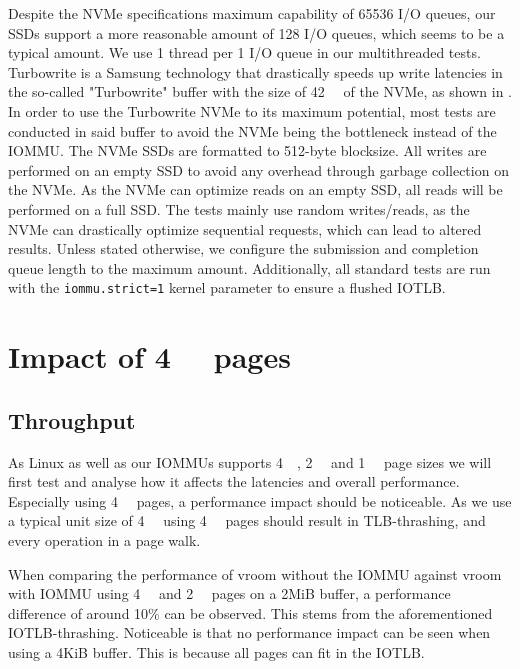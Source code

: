 Despite the NVMe specifications maximum capability of 65536 I/O queues, our SSDs support a more reasonable amount of 128 I/O queues, which seems to be a typical amount.
We use 1 thread per 1 I/O queue in our multithreaded tests. Turbowrite is a Samsung technology that drastically speeds up write latencies in the so-called "Turbowrite" buffer with the size of \qty{42}{\giga\byte} of the NVMe, as shown in \cite{vroom}. In order to use the Turbowrite NVMe to its maximum potential, most tests are conducted in said buffer to avoid the NVMe being the bottleneck instead of the IOMMU.
The NVMe SSDs are formatted to 512-byte blocksize. All writes are performed on an empty SSD to avoid any overhead through garbage collection on the NVMe. As the NVMe can optimize reads on an empty SSD, all reads will be performed on a full SSD. The tests mainly use random writes/reads, as the NVMe can drastically optimize sequential requests, which can lead to altered results.
Unless stated otherwise, we configure the submission and completion queue length to the maximum amount.
Additionally, all standard tests are run with the \texttt{iommu.strict=1} kernel parameter to ensure a flushed IOTLB.

\section{Impact of \qty{4}{\kibi\byte} pages}
\subsection{Throughput}
As Linux as well as our IOMMUs supports \qty{4}{\kibi\byte}, \qty{2}{\mebi\byte} and \qty{1}{\gibi\byte} page sizes we will first test and analyse how it affects the latencies and overall performance. Especially using \qty{4}{\kibi\byte} pages, a performance impact should be noticeable. As we use a typical unit size of \qty{4}{\kibi\byte} using \qty{4}{\kibi\byte} pages should result in TLB-thrashing, and every operation in a page walk.

When comparing the performance of vroom without the IOMMU against vroom with IOMMU using \qty{4}{\kibi\byte} and \qty{2}{\mebi\byte} pages on a 2MiB buffer, a performance difference of around 10\% can be observed. This stems from the aforementioned IOTLB-thrashing. Noticeable is that no performance impact can be seen when using a 4KiB buffer. This is because all pages can fit in the IOTLB.

